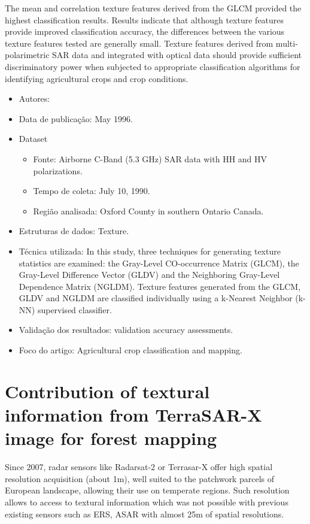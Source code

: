 \documentclass[paper=a4, fontsize=11pt]{scrartcl}
\begin{document}
The mean and correlation texture features derived from the GLCM provided the highest classification results. 
Results indicate that although texture features provide improved classification accuracy, the differences between the various texture features tested are generally small. 
Texture features derived from multi-polarimetric SAR data and integrated with optical data should provide sufficient discriminatory power when subjected to appropriate classification algorithms for identifying agricultural crops and crop conditions.  

\begin{itemize}
    \item Autores:~\cite{treitz1996textural}
    \item Data de publicação:  May 1996.
    \item Dataset
    \begin{itemize}
        \item Fonte: Airborne C-Band (5.3 GHz) SAR data with HH and HV polarizations.
        \item Tempo de coleta: July 10, 1990.
        \item Região analisada: Oxford County in southern Ontario Canada.
    \end{itemize}
    \item Estruturas de dados: Texture.
    \item Técnica utilizada: In this study, three techniques for generating texture statistics are examined: the Gray-Level CO-occurrence Matrix (GLCM), the Gray-Level Difference Vector (GLDV) and the Neighboring Gray-Level Dependence Matrix (NGLDM). Texture features generated from the GLCM, GLDV and NGLDM are classified individually using a k-Nearest Neighbor (k-NN) supervised classifier.
    \item Validação dos resultados: validation accuracy assessments.
    \item Foco do artigo: Agricultural crop classification and mapping.
\end{itemize}

\newpage

\section*{\textcolor{VioletRed4}{Contribution of textural information from TerraSAR-X image for forest mapping}}

Since 2007, radar sensors like Radarsat-2 or Terrasar-X offer high spatial resolution acquisition (about 1m), well suited to the patchwork parcels of European landscape, allowing their use on temperate regions.
Such resolution allows to access to textural information which was not possible with previous existing sensors such as ERS, ASAR with almost 25m of spatial resolutions.
\end{document}
